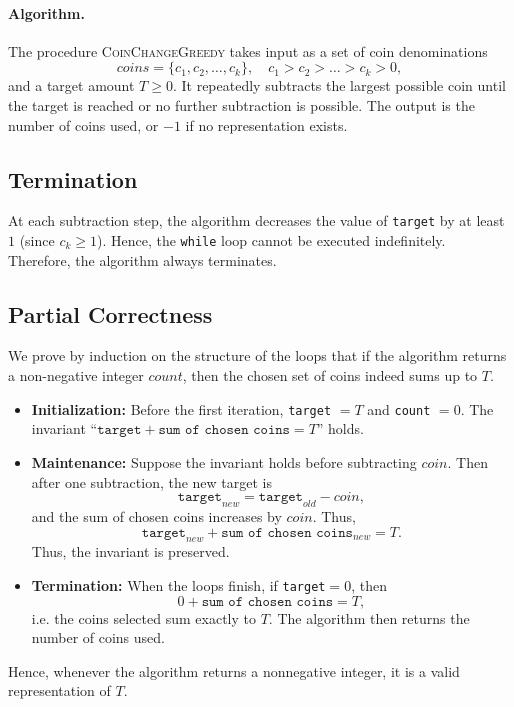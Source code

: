 \documentclass[12pt,a4paper]{report}
\begin{document}
\paragraph{Algorithm.}
The procedure \textsc{CoinChangeGreedy} takes input as a set of coin denominations 
\[
coins = \{c_1, c_2, \dots, c_k\}, \quad c_1 > c_2 > \dots > c_k > 0,
\]
and a target amount $T \geq 0$. It repeatedly subtracts the largest possible coin until the target is reached or no further subtraction is possible. The output is the number of coins used, or $-1$ if no representation exists.

\subsection*{Termination}
At each subtraction step, the algorithm decreases the value of \texttt{target} by at least $1$ (since $c_k \geq 1$). Hence, the \texttt{while} loop cannot be executed indefinitely.  
Therefore, the algorithm always terminates.

\subsection*{Partial Correctness}
We prove by induction on the structure of the loops that if the algorithm returns a non-negative integer $count$, then the chosen set of coins indeed sums up to $T$.

\begin{itemize}
    \item \textbf{Initialization:} Before the first iteration, \texttt{target} $=T$ and \texttt{count} $=0$. The invariant ``$\texttt{target} + \texttt{sum of chosen coins} = T$'' holds.
    \item \textbf{Maintenance:} Suppose the invariant holds before subtracting $coin$. Then after one subtraction, the new target is
    \[
    \texttt{target}_{new} = \texttt{target}_{old} - coin,
    \]
    and the sum of chosen coins increases by $coin$. Thus,
    \[
    \texttt{target}_{new} + \texttt{sum of chosen coins}_{new} = T.
    \]
    Thus, the invariant is preserved.
    \item \textbf{Termination:} When the loops finish, if \texttt{target}$=0$, then
    \[
    0 + \texttt{sum of chosen coins} = T,
    \]
    i.e. the coins selected sum exactly to $T$. The algorithm then returns the number of coins used.
\end{itemize}

Hence, whenever the algorithm returns a nonnegative integer, it is a valid representation of $T$.
\end{document}
